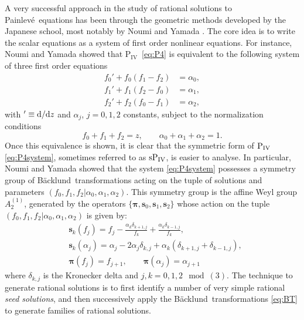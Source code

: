 \documentclass[10pt]{amsart}
\theoremstyle{definition}
\numberwithin{equation}{section}
\numberwithin{figure}{section}
\newcommand{\Pfour}{{\rm P_{IV}}}
\newcommand{\PIV}{$\mathrm{P}_{\mathrm{IV}}$}
\newcommand{\p}{Painlev\'{e}}
\newcommand{\bk}{B\"acklund}
\def\d{{\rm d}}
\newcommand{\deriv}[3][]{\frac{\d^{#1}{#2}}{{\d{#3}}^{#1}}}
\renewcommand{\a}{\alpha}
\begin{document}
A very successful approach in the study of rational solutions to \p\ equations has been through the geometric methods developed by the Japanese school, most notably by Noumi and Yamada \cite{noumi2004painleve}. The core idea is to write the scalar equations as a system of  first order nonlinear equations. For instance, Noumi and Yamada \cite{noumi2004painleve} showed that \PIV\ \eqref{eq:P4}
is equivalent to the following system of three first order equations
\begin{align}\label{eq:P4system}
f_0' + f_0(f_1-f_2) &= \a_0, \nonumber\\
f_1' + f_1(f_2-f_0) &= \a_1,\\
f_2' + f_2(f_0-f_1) &= \a_2, \nonumber 
\end{align}
with $'\equiv \d/\d z$ and $\a_j$, $j=0,1,2$ constants,
subject to the normalization conditions
\begin{equation}\label{eq:P4normalization}
f_0+f_1+f_2=z,\qquad \a_0+\a_1+\a_2=1.
\end{equation}
Once this equivalence is shown, it is clear that the symmetric form of
$\Pfour$ \eqref{eq:P4system}, sometimes referred to as $\rm{s}\Pfour$,
is easier to analyse. In particular, Noumi and Yamada
\cite{noumi1999symmetries} showed that the system \eqref{eq:P4system}
possesses a symmetry group of \bk\ transformations acting on the
tuple of solutions and parameters
$(f_0,f_1,f_2 |\a_0,\a_1,\a_2)$. This symmetry group is
the affine Weyl group $A_2^{(1)}$, generated by the operators
$\{ \boldsymbol{\pi},\textbf{s}_0, \textbf{s}_1, \textbf{s}_2\}$ whose
action on the tuple $(f_0,f_1,f_2 |\a_0,\a_1,\a_2)$ is
given by:
\begin{align}\label{eq:BT}
&\textbf{s}_k (f_j)=f_j-\frac{\a_k\delta_{k+1,j}}{f_k}+\frac{\a_k\delta_{k-1,j}}{f_k}, \nonumber\\
&\textbf{s}_k(\a_j)=\a_j-2\a_j\delta_{k,j}+\a_k(\delta_{k+1,j}+\delta_{k-1,j}),\\
&\boldsymbol{\pi}(f_j)=f_{j+1},\qquad  \boldsymbol{\pi}(\a_j)=\a_{j+1} \nonumber
\end{align}
where $\delta_{k,j}$ is the Kronecker delta and $j,k=0,1,2 \mod(3)$.
The technique to generate rational solutions is to first identify a
number of very simple rational \textit{seed solutions}, and then
successively apply the \bk\ transformations \eqref{eq:BT} to
generate families of rational solutions.
\end{document}
